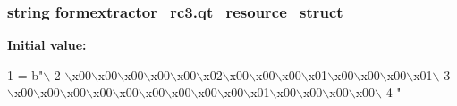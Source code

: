 \subsubsection[{qt\+\_\+resource\+\_\+struct}]{\setlength{\rightskip}{0pt plus 5cm}string formextractor\+\_\+rc3.\+qt\+\_\+resource\+\_\+struct}\label{namespaceformextractor__rc3_a7a672a5c19411834a8c25f1f826d3a9f}
{\bfseries Initial value\+:}
\begin{DoxyCode}
1 = b\textcolor{stringliteral}{"\(\backslash\)}
2 \textcolor{stringliteral}{\(\backslash\)x00\(\backslash\)x00\(\backslash\)x00\(\backslash\)x00\(\backslash\)x00\(\backslash\)x02\(\backslash\)x00\(\backslash\)x00\(\backslash\)x00\(\backslash\)x01\(\backslash\)x00\(\backslash\)x00\(\backslash\)x00\(\backslash\)x01\(\backslash\)}
3 \textcolor{stringliteral}{\(\backslash\)x00\(\backslash\)x00\(\backslash\)x00\(\backslash\)x00\(\backslash\)x00\(\backslash\)x00\(\backslash\)x00\(\backslash\)x00\(\backslash\)x00\(\backslash\)x01\(\backslash\)x00\(\backslash\)x00\(\backslash\)x00\(\backslash\)x00\(\backslash\)}
4 \textcolor{stringliteral}{"}
\end{DoxyCode}
